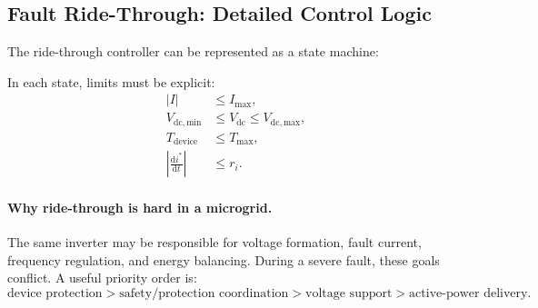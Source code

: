 \documentclass[11pt]{article}
\newcommand{\dd}{\mathrm{d}}
\begin{document}
\subsection{Fault Ride-Through: Detailed Control Logic}
The ride-through controller can be represented as a state machine:
\begin{center}
\end{center}
In each state, limits must be explicit:
\begin{align}
|I|&\le I_{\max},\\
V_{\mathrm{dc,min}}&\le V_{\mathrm{dc}}\le V_{\mathrm{dc,max}},\\
T_{\mathrm{device}}&\le T_{\max},\\
\left|\frac{\dd i^*}{\dd t}\right|&\le r_i.
\end{align}

\paragraph{Why ride-through is hard in a microgrid.}
The same inverter may be responsible for voltage formation, fault current,
frequency regulation, and energy balancing. During a severe fault, these goals
conflict. A useful priority order is:
\begin{equation}
\text{device protection} > \text{safety/protection coordination} >
\text{voltage support} > \text{active-power delivery}.
\end{equation}
\end{document}
